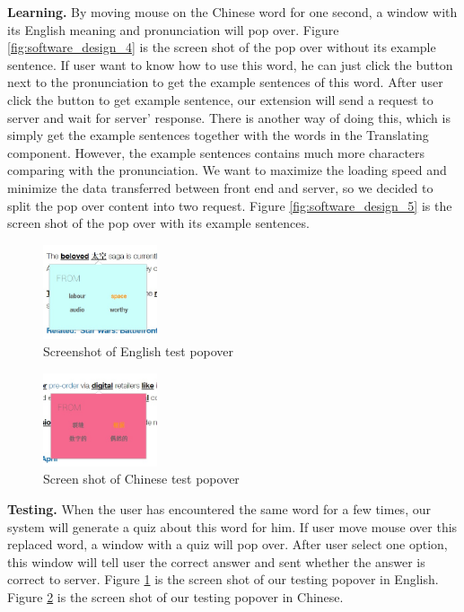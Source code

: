 {\bf Learning.} By moving mouse on the Chinese word for one second, a window with its English meaning and pronunciation will pop over. Figure \ref{fig:software_design_4} is the screen shot of the pop over without its example sentence. If user want to know how to use this word, he can just click the button next to the pronunciation to get the example sentences of this word. After user click the button to get example sentence, our extension will send a request to server and wait for server' response. There is another way of doing this, which is simply get the example sentences together with the words in the Translating component. However, the example sentences contains much more characters comparing with the pronunciation. We want to maximize the loading speed and minimize the data transferred between front end and server, so we decided to split the pop over content into two request. Figure \ref{fig:software_design_5} is the screen shot of the pop over with its example sentences.

\begin{figure}[ht]
\centering
  \centering
  \includegraphics[width=0.3\textwidth]{software_design_7.jpg}
  \caption{Screenshot of English test popover}
  \label{fig:software_design_7}
\end{figure}

\begin{figure}[ht]
    \centering
  \includegraphics[width=0.3\textwidth]{software_design_8.jpg}
  \caption{Screen shot of Chinese test popover}
  \label{fig:software_design_8}
\end{figure}
{\bf Testing.} When the user has encountered the same word for a few times, our system will generate a quiz about this word for him.  If user move mouse over this replaced word, a window with a quiz will pop over. After user select one option, this window will tell user the correct answer and sent whether the answer is correct to server. Figure \ref{fig:software_design_7} is the screen shot of our testing popover in English. Figure \ref{fig:software_design_8} is the screen shot of our testing popover in Chinese.

